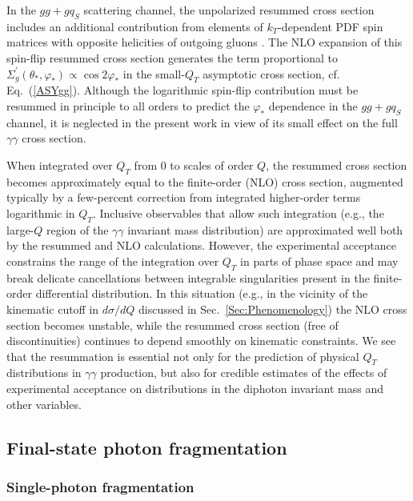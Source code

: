 \documentclass[12pt,english,aps,preprint,prd,letterpaper,fleqn,nofootinbib,showpacs,showkeys,tightenlines,floatfix]{revtex4}
\begin{document}
In the $gg+gq_{S}$ scattering channel, the unpolarized resummed cross
section includes an additional contribution from elements of $k_{T}$-dependent
PDF spin matrices with opposite helicities of outgoing gluons \cite{Nadolsky:2007ba}.
The NLO expansion of this spin-flip resummed cross section generates
the term proportional to $\Sigma_{g}^{\prime}(\theta_{*},\varphi_{*})\propto\cos2\varphi_{*}$
in the small-$Q_{T}$ asymptotic cross section, cf.  Eq.~(\ref{ASYgg}).
Although the logarithmic spin-flip contribution must
be resummed in principle to all orders to predict the $\varphi_{*}$ dependence
in the $gg+gq_{S}$ channel, it is neglected in the present work in
view of its small effect on the full $\gamma\gamma$ cross section.

When integrated over $Q_T$ from 0 to scales of order $Q$, the resummed
cross section becomes approximately equal to the finite-order (NLO)
cross section, augmented typically by a few-percent correction from integrated
higher-order terms logarithmic in $Q_{T}$. Inclusive observables
that allow such integration (e.g., the large-$Q$ region of the $\gamma\gamma$
invariant mass distribution) are approximated well both by the resummed
and NLO calculations. However, the experimental acceptance constrains
the range of the integration over $Q_{T}$ in parts of phase space
and may break delicate cancellations between integrable singularities
present in the finite-order differential distribution. In this situation
(e.g., in the vicinity of the kinematic cutoff in $d\sigma/dQ$ discussed
in Sec.~\ref{Sec:Phenomenology}) the NLO cross section becomes unstable,
while the resummed cross section (free of discontinuities) continues
to depend smoothly on kinematic constraints. We see that the resummation
is essential not only for the prediction of physical $Q_{T}$ distributions
in $\gamma\gamma$ production, but also for credible estimates of
the effects of experimental acceptance on distributions in the diphoton
invariant mass and other variables.


\subsection{Final-state photon fragmentation \label{subsection:Fragmentation-model}}


\subsubsection{Single-photon fragmentation}
\end{document}
